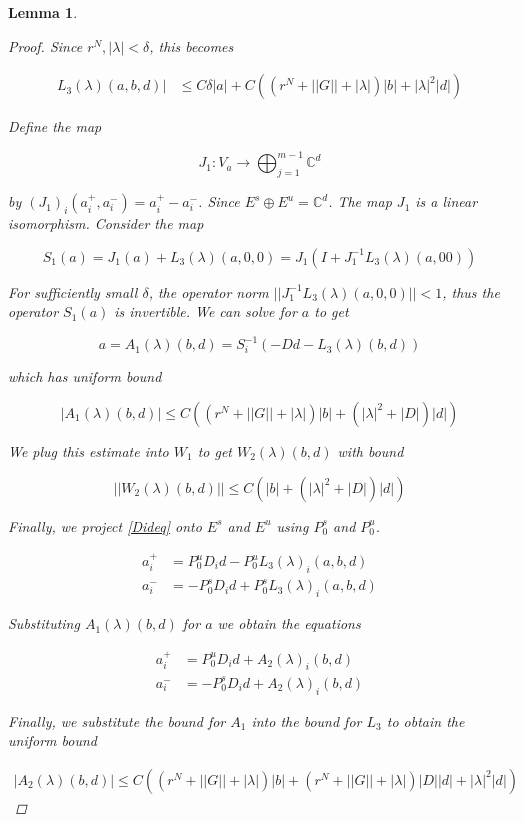 \documentclass[12pt]{article}
\def\C{{\mathbb C}}
\newtheorem{lemma}{Lemma}
\begin{document}
\begin{lemma}
\begin{proof}
Since $r^N, |\lambda| < \delta$, this becomes

\begin{align*}
L_3(\lambda)(a,b,d)| &\leq C \delta |a| + C\left( (r^N + ||G|| + |\lambda| ) |b| + |\lambda|^2 |d|  \right)
\end{align*}

Define the map

\[
J_1: V_a \rightarrow \bigoplus_{j=1}^{m-1} \C^d
\]

by $(J_1)_i(a_i^+, a_i^-) = a_i^+ - a_i^-$. Since $E^s \oplus E^u = \C^d$.  The map $J_1$ is a linear isomorphism. Consider the map

\[
S_1(a) = J_1 (a) + L_3(\lambda)(a, 0, 0) = J_1( I + J_1^{-1} L_3(\lambda)(a, 0 0) )
\]

For sufficiently small $\delta$, the operator norm $||J_1^{-1} L_3(\lambda)(a, 0, 0)|| < 1$, thus the operator $S_1(a)$ is invertible. We can solve for $a$ to get

\[
a = A_1(\lambda)(b, d) = S_i^{-1}(-D d - L_3(\lambda)(b, d))
\]

which has uniform bound

\begin{equation*}
|A_1(\lambda)(b, d)| \leq C \left( (r^N + ||G|| + |\lambda| ) |b| + (|\lambda|^2 + |D| ) |d|  \right)
\end{equation*}

We plug this estimate into $W_1$ to get $W_2(\lambda)(b,d)$ with bound

\begin{equation}\label{W1bound}
||W_2(\lambda)(b,d)|| \leq C \left( |b| + (|\lambda|^2 + |D|) |d| \right)
\end{equation}

Finally, we project \eqref{Dideq} onto $E^s$ and $E^u$ using $P_0^s$ and $P_0^u$.

\begin{align*}
a_i^+ &= P_0^u D_i d - P_0^u L_3(\lambda)_i(a,b,d) \\
a_i^- &= -P_0^s D_i d + P_0^s L_3(\lambda)_i(a,b,d)
\end{align*}

Substituting $A_1(\lambda)(b,d)$ for $a$ we obtain the equations

\begin{align*}
a_i^+ &= P_0^u D_i d + A_2(\lambda)_i(b,d) \\
a_i^- &= -P_0^s D_i d + A_2(\lambda)_i(b,d)
\end{align*}

Finally, we substitute the bound for $A_1$ into the bound for $L_3$ to obtain the uniform bound

\begin{align*}
|A_2(\lambda)(b,d)| \leq 
C\left( (r^N + ||G|| + |\lambda| )|b| + (r^N + ||G|| + |\lambda|)|D||d| + |\lambda|^2 |d|  \right)
\end{align*}

\end{proof}
\end{lemma}
\end{document}
